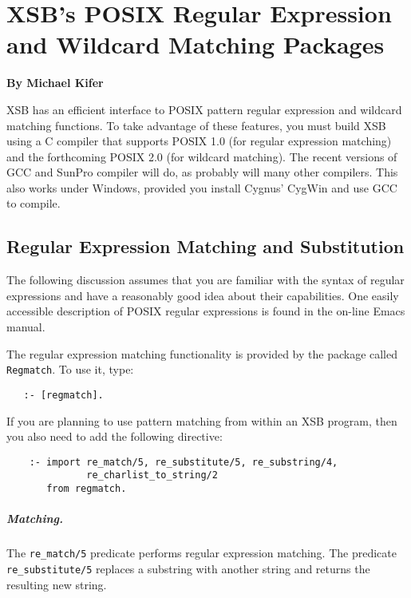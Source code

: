 \chapter{XSB's POSIX Regular Expression and Wildcard Matching Packages}

\begin{center}
{\Large {\bf By Michael Kifer}}
\end{center}

XSB has an efficient interface to POSIX pattern regular expression and
wildcard matching functions.  To take advantage of these features, you must
build XSB using a C compiler that supports POSIX 1.0 (for regular
expression matching) and the forthcoming POSIX 2.0 (for wildcard matching).
The recent versions of GCC and SunPro compiler will do, as probably will
many other compilers. This also works under Windows, provided you install
Cygnus' CygWin and use GCC to compile.

\section{Regular Expression Matching and Substitution}

The following discussion assumes that you are familiar with the syntax of
regular expressions and have a reasonably good idea about their
capabilities. One easily accessible description of POSIX regular
expressions is found in the on-line Emacs manual.

The regular expression matching functionality is provided by the package
called {\tt Regmatch}. To use it, type:
\begin{verbatim}
   :- [regmatch].
\end{verbatim}

If you are planning to use pattern matching from within an XSB program,
then you also need to add the following directive:
\begin{verbatim}
    :- import re_match/5, re_substitute/5, re_substring/4,
              re_charlist_to_string/2
       from regmatch.
\end{verbatim}

\paragraph{Matching.}
The \verb|re_match/5| predicate performs regular expression matching.
The predicate \verb|re_substitute/5| replaces a substring with another
string and returns the resulting new string.

